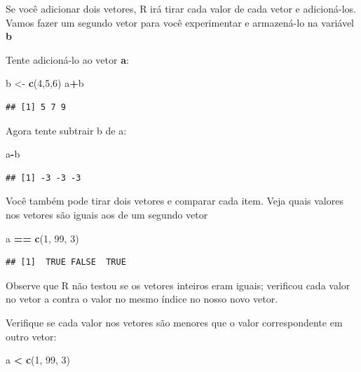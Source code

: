 \documentclass[
]{book}
\newenvironment{Shaded}{\begin{snugshade}}{\end{snugshade}}
\newcommand{\DecValTok}[1]{\textcolor[rgb]{0.00,0.00,0.81}{#1}}
\newcommand{\KeywordTok}[1]{\textcolor[rgb]{0.13,0.29,0.53}{\textbf{#1}}}
\newcommand{\NormalTok}[1]{#1}
\newcommand{\OperatorTok}[1]{\textcolor[rgb]{0.81,0.36,0.00}{\textbf{#1}}}
\newcommand{\StringTok}[1]{\textcolor[rgb]{0.31,0.60,0.02}{#1}}
\begin{document}
Se você adicionar dois vetores, R irá tirar cada valor de cada vetor e adicioná-los. Vamos fazer um segundo vetor para você experimentar e armazená-lo na variável \textbf{b}

Tente adicioná-lo ao vetor \textbf{a}:

\begin{Shaded}
\begin{Highlighting}[]
\NormalTok{b <-}\StringTok{ }\KeywordTok{c}\NormalTok{(}\DecValTok{4}\NormalTok{,}\DecValTok{5}\NormalTok{,}\DecValTok{6}\NormalTok{)}
\NormalTok{a}\OperatorTok{+}\NormalTok{b}
\end{Highlighting}
\end{Shaded}

\begin{verbatim}
## [1] 5 7 9
\end{verbatim}

Agora tente subtrair b de a:

\begin{Shaded}
\begin{Highlighting}[]
\NormalTok{a}\OperatorTok{-}\NormalTok{b}
\end{Highlighting}
\end{Shaded}

\begin{verbatim}
## [1] -3 -3 -3
\end{verbatim}

Você também pode tirar dois vetores e comparar cada item. Veja quais valores nos vetores são iguais aos de um segundo vetor

\begin{Shaded}
\begin{Highlighting}[]
\NormalTok{a }\OperatorTok{==}\StringTok{ }\KeywordTok{c}\NormalTok{(}\DecValTok{1}\NormalTok{, }\DecValTok{99}\NormalTok{, }\DecValTok{3}\NormalTok{)}
\end{Highlighting}
\end{Shaded}

\begin{verbatim}
## [1]  TRUE FALSE  TRUE
\end{verbatim}

Observe que R não testou se os vetores inteiros eram iguais; verificou cada valor no vetor a contra o valor no mesmo índice no nosso novo vetor.

Verifique se cada valor nos vetores são menores que o valor correspondente em outro vetor:

\begin{Shaded}
\begin{Highlighting}[]
\NormalTok{a }\OperatorTok{<}\StringTok{ }\KeywordTok{c}\NormalTok{(}\DecValTok{1}\NormalTok{, }\DecValTok{99}\NormalTok{, }\DecValTok{3}\NormalTok{)}
\end{Highlighting}
\end{Shaded}
\end{document}
